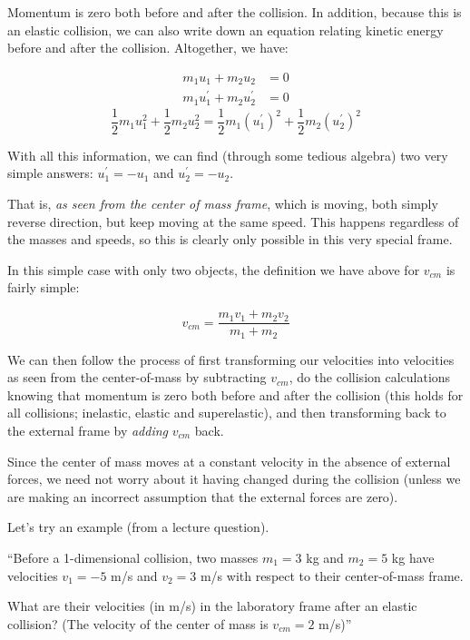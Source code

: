 Momentum is zero both before and after the collision. In addition, because this is an elastic collision, we can also write down an equation relating kinetic energy before and after the collision. Altogether, we have:

\begin{align}
m_1 u_1 + m_2 u_2 &= 0\\
m_1 u_1^{'} + m_2 u_2^{'} &= 0
\end{align}
\begin{equation}
\frac{1}{2} m_1 u_1^2 + \frac{1}{2} m_2 u_2^2 = \frac{1}{2} m_1 (u_1^{'})^2 + \frac{1}{2} m_2 (u_2^{'})^2
\end{equation}

With all this information, we can find (through some tedious algebra) two very simple answers: $u_1^{'} = -u_1$ and $u_2^{'} = -u_2$.

That is, \emph{as seen from the center of mass frame}, which is moving, both simply reverse direction, but keep moving at the same speed. This happens regardless of the masses and speeds, so this is clearly only possible in this very special frame.

In this simple case with only two objects, the definition we have above for $v_{cm}$ is fairly simple:

\begin{equation}
v_{cm} = \frac{m_1 v_1 + m_2 v_2}{m_1 + m_2}
\end{equation}

We can then follow the process of first transforming our velocities into velocities as seen from the center-of-mass by subtracting $v_{cm}$, do the collision calculations knowing that momentum is zero both before and after the collision (this holds for all collisions; inelastic, elastic and superelastic), and then transforming back to the external frame by \emph{adding} $v_{cm}$ back.

Since the center of mass moves at a constant velocity in the absence of external forces, we need not worry about it having changed during the collision (unless we are making an incorrect assumption that the external forces are zero).

Let's try an example (from a lecture question).

``Before a 1-dimensional collision, two masses $m_1 = 3$ kg and $m_2 = 5$ kg have velocities $v_1 = -5$ m/s and $v_2 = 3$ m/s with respect to their center-of-mass frame.

What are their velocities (in m/s) in the laboratory frame after an elastic collision? (The velocity of the center of mass is $v_{cm} = 2$ m/s)''


